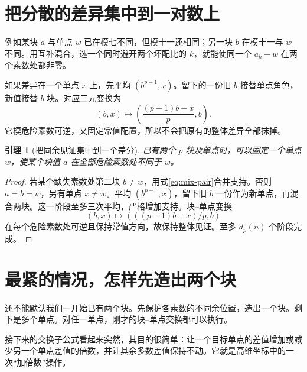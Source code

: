 \documentclass[11pt,a4paper,oneside,openany]{book}
\newtheorem{lemma}[theorem]{引理}
\theoremstyle{definition}
\numberwithin{equation}{chapter}
\begin{document}
\section{把分散的差异集中到一对数上}
例如某块 $a$ 与单点 $w$ 已在模七不同，但模十一还相同；另一块 $b$ 在模十一与 $w$ 不同。用互补混合，选一个同时避开两个坏配比的 $k$，就能使同一个 $a_k-w$ 在两个素数处都非零。

如果差异在一个单点 $x$ 上，先平均 $(b^{p-1},x)$。留下的一份旧 $b$ 接替单点角色，新值接替 $b$ 块。对应二元变换为
\[(b,x)\mapsto\left(\frac{(p-1)b+x}{p},b\right).
\]
它模危险素数可逆，又固定常值配置，所以不会把原有的整体差异全部抹掉。
\begin{lemma}[把同余见证集中到一个差分]\label{lem:concentrate}
已有两个 $p$ 块及单点时，可以固定一个单点 $w$，使某个块值 $a$ 在全部危险素数处不同于 $w$。
\end{lemma}
\begin{proof}
若某个缺失素数处第二块 $b\ne w$，用式\eqref{eq:mix-pair}合并支持。否则 $a=b=w$，另有单点 $x\ne w$。平均 $(b^{p-1},x)$，留下旧 $b$ 一份作为新单点，再混合两块。这一阶段至多三次平均，严格增加支持。块--单点变换
\begin{equation}\label{eq:exchange}
(b,x)\longmapsto(((p-1)b+x)/p,b)
\end{equation}
在每个危险素数处可逆且保持常值方向，故保持整体见证。至多 $d_p(n)$ 个阶段完成。
\end{proof}

\section{最紧的情况，怎样先造出两个块}
还不能默认我们一开始已有两个块。先保护各素数的不同余位置，造出一个块。剩下是多个单点。对任一单点，刚才的块--单点交换都可以执行。

接下来的交换子公式看起来突然，其目的很简单：让一个目标单点的差值增加或减少另一个单点差值的倍数，并让其余多数差值保持不动。它就是高维坐标中的一次“加倍数”操作。
\end{document}
